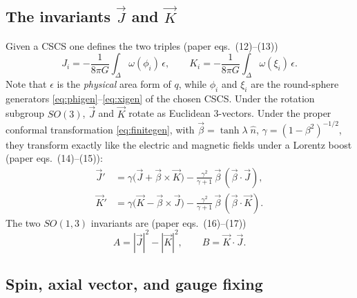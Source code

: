 \documentclass[11pt]{article}
\newcommand{\vJ}{\vec{J}}
\newcommand{\vK}{\vec{K}}
\newcommand{\vbeta}{\vec{\beta}}
\newcommand{\vn}{\hat{n}}
\begin{document}
\subsection{The invariants \texorpdfstring{$\vJ$ and $\vK$}{J and K}}

Given a CSCS one defines the two triples (paper eqs.~(12)--(13))
\begin{equation}
  \boxed{\;
  J_i = -\frac{1}{8\pi G}\int_\Delta \omega(\phi_i)\,\epsilon,
  \qquad
  K_i = -\frac{1}{8\pi G}\int_\Delta \omega(\xi_i)\,\epsilon .
  \;}
  \label{eq:JKdef}
\end{equation}
Note that $\epsilon$ is the \emph{physical} area form of $q$, while $\phi_i$
and $\xi_i$ are the round-sphere generators \eqref{eq:phigen}--\eqref{eq:xigen}
of the chosen CSCS.  Under the rotation subgroup $SO(3)$, $\vJ$ and $\vK$
rotate as Euclidean 3-vectors.  Under the proper conformal transformation
\eqref{eq:finitegen}, with
$\vbeta = \tanh\lambda\;\vn$, $\gamma = (1-\beta^2)^{-1/2}$,
they transform exactly like the electric and magnetic fields under a Lorentz
boost (paper eqs.~(14)--(15)):
\begin{equation}
  \begin{aligned}
    \vJ' &= \gamma\bigl(\vJ + \vbeta\times\vK\bigr)
            - \frac{\gamma^2}{\gamma+1}\,\vbeta\,(\vbeta\cdot\vJ),\\
    \vK' &= \gamma\bigl(\vK - \vbeta\times\vJ\bigr)
            - \frac{\gamma^2}{\gamma+1}\,\vbeta\,(\vbeta\cdot\vK).
  \end{aligned}
  \label{eq:boost}
\end{equation}
The two $SO(1,3)$ invariants are (paper eqs.~(16)--(17))
\begin{equation}
  A = |\vJ|^2 - |\vK|^2, \qquad B = \vK\cdot\vJ .
  \label{eq:AB}
\end{equation}

\subsection{Spin, axial vector, and gauge fixing}
\label{sec:spindef}
\end{document}

